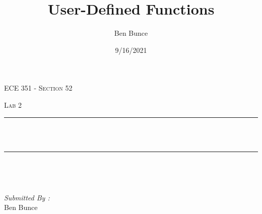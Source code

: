 \documentclass[12pt]{report}
\title{User-Defined Functions}
\author{Ben Bunce}
\date{9/16/2021}
\makeatletter
\let\thetitle\@title
\makeatother
\begin{document}

\begin{titlepage}
	\centering
    \vspace*{0.5 cm}
\begin{center}    \textsc{\Large   ECE 351 - Section 52}\\[2.0 cm]	\end{center}%
	\textsc{\Large Lab 2  }\\[0.5 cm]				%
	\rule{\linewidth}{0.2 mm} \\[0.4 cm]
	{ \huge \bfseries \thetitle}\\
	\rule{\linewidth}{0.2 mm} \\[1.5 cm]
	
	\begin{minipage}{0.4\textwidth}
		\begin{flushleft} \large
			\end{flushleft}
			\end{minipage}~
			\begin{minipage}{0.4\textwidth}
            
			\begin{flushright} \large
			\emph{Submitted By :} \\
			Ben Bunce  
		\end{flushright}
           
	\end{minipage}\\[2 cm]
	
    
    
    
    
	
\end{titlepage}


\tableofcontents
\pagebreak

\renewcommand{\thesection}{\arabic{section}}
\end{document}
